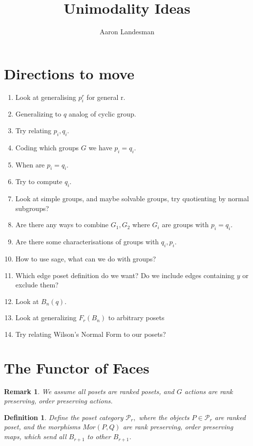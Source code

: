 \documentclass{amsart}
\title{Unimodality Ideas}
\author{Aaron Landesman}
\newtheorem{defn}[subsubsection]{Definition}
\newtheorem{rem}[subsubsection]{Remark}
\begin{document}
\maketitle
\section{Directions to move}
\begin{enumerate}
	\item Look at generalising $p_i^r$ for general r.
	\item Generalizing to $q$ analog of cyclic group.
	\item Try relating $p_i,q_i.$
	\item Coding which groups $G$ we have $p_i=q_i.$
	\item When are $p_i = q_i.$
	\item Try to compute $q_i.$
	\item Look at simple groups, and maybe solvable groups, try quotienting by normal subgroups?
	\item Are there any ways to combine $G_1,G_2$ where $G_i$ are groups with $p_i = q_i.$
	\item Are there some characterisations of groups with $q_i,p_i.$
	\item How to use sage, what can we do with groups?
	\item Which edge poset definition do we want? Do we include edges containing $y$ or exclude them?
	\item Look at $B_n(q).$ 
	\item Look at generalizing $F_r(B_n)$ to arbitrary posets
	\item Try relating Wilson's Normal Form to our posets?
\end{enumerate}

\section{The Functor of Faces}
\begin{rem}
We assume all posets are ranked posets, and $G$ actions are rank preserving, order preserving actions.
\end{rem}

\begin{defn}
Define the poset category $\mathcal P_r,$ where the objects $P \in \mathcal P_r$ are ranked poset, and the morphisms $Mor(P,Q)$ are rank preserving, order preserving maps, which send all $B_{r+1}$ to other $B_{r+1}$.
\end{defn}
\end{document}
